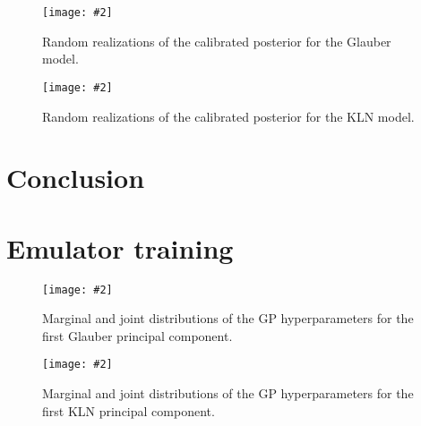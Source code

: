 \documentclass[aps, prc, reprint, amsmath]{revtex4-1}
\newcommand{\widefig}[3][t]{
  \begin{figure*}[#1]
    \texttt{[image: \#2]}
    \caption{\label{fig:#2}#3}
  \end{figure*}
}
\begin{document}
\widefig{posterior_draws_glb}{
  Random realizations of the calibrated posterior for the Glauber model.
}

\widefig{posterior_draws_kln}{
  Random realizations of the calibrated posterior for the KLN model.
}



\section{Conclusion}



\appendix


\section{Emulator training}

\widefig{training_posterior_glb}{
  Marginal and joint distributions of the GP hyperparameters for the first Glauber principal component.
}

\widefig{training_posterior_kln}{
  Marginal and joint distributions of the GP hyperparameters for the first KLN principal component.
}




\end{document}
